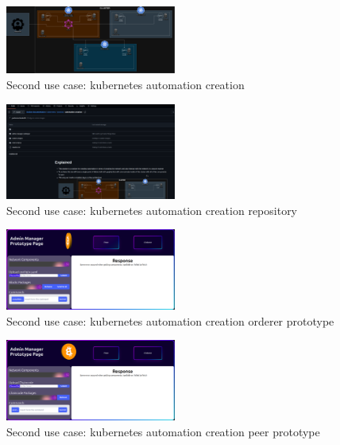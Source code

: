 \begin{figure}[H]
    \centering
    \includegraphics[width=0.5\textwidth]{assets/use-case-2/automation-diagram.drawio.png} %
    \caption{Second use case: kubernetes automation creation}
    \label{fig:sample-image} 
\end{figure}

\begin{figure}[H]
    \centering
    \includegraphics[width=0.5\textwidth]{assets/use-case-2/automation-creation.png} %
    \caption{Second use case: kubernetes automation creation repository}
    \label{fig:sample-image} 
\end{figure}

\begin{figure}[H]
    \centering
    \includegraphics[width=0.5\textwidth]{assets/use-case-2/orderer-admin-manager.png} %
    \caption{Second use case: kubernetes automation creation orderer prototype}
    \label{fig:sample-image} 
\end{figure}

\begin{figure}[H]
    \centering
    \includegraphics[width=0.5\textwidth]{assets/use-case-2/peer-manager-prototype-page.png} %
    \caption{Second use case: kubernetes automation creation peer prototype}
    \label{fig:sample-image} 
\end{figure}

